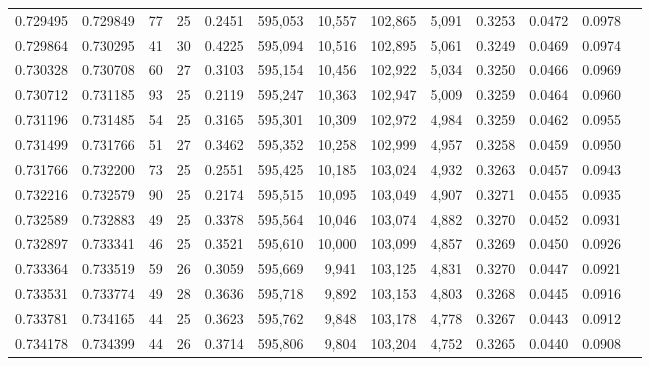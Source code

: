 \begin{tabular}{rrrrrrrrrrrrr}
0.729495 & 0.729849 &  77 &  25 &                                     0.2451 & 595,053 &  10,557 & 102,865 &   5,091 & 0.3253 & 0.0472 & 0.0978 \\
0.729864 & 0.730295 &  41 &  30 &                                     0.4225 & 595,094 &  10,516 & 102,895 &   5,061 & 0.3249 & 0.0469 & 0.0974 \\
0.730328 & 0.730708 &  60 &  27 &                                     0.3103 & 595,154 &  10,456 & 102,922 &   5,034 & 0.3250 & 0.0466 & 0.0969 \\
0.730712 & 0.731185 &  93 &  25 &                                     0.2119 & 595,247 &  10,363 & 102,947 &   5,009 & 0.3259 & 0.0464 & 0.0960 \\
0.731196 & 0.731485 &  54 &  25 &                                     0.3165 & 595,301 &  10,309 & 102,972 &   4,984 & 0.3259 & 0.0462 & 0.0955 \\
0.731499 & 0.731766 &  51 &  27 &                                     0.3462 & 595,352 &  10,258 & 102,999 &   4,957 & 0.3258 & 0.0459 & 0.0950 \\
0.731766 & 0.732200 &  73 &  25 &                                     0.2551 & 595,425 &  10,185 & 103,024 &   4,932 & 0.3263 & 0.0457 & 0.0943 \\
0.732216 & 0.732579 &  90 &  25 &                                     0.2174 & 595,515 &  10,095 & 103,049 &   4,907 & 0.3271 & 0.0455 & 0.0935 \\
0.732589 & 0.732883 &  49 &  25 &                                     0.3378 & 595,564 &  10,046 & 103,074 &   4,882 & 0.3270 & 0.0452 & 0.0931 \\
0.732897 & 0.733341 &  46 &  25 &                                     0.3521 & 595,610 &  10,000 & 103,099 &   4,857 & 0.3269 & 0.0450 & 0.0926 \\
0.733364 & 0.733519 &  59 &  26 &                                     0.3059 & 595,669 &   9,941 & 103,125 &   4,831 & 0.3270 & 0.0447 & 0.0921 \\
0.733531 & 0.733774 &  49 &  28 &                                     0.3636 & 595,718 &   9,892 & 103,153 &   4,803 & 0.3268 & 0.0445 & 0.0916 \\
0.733781 & 0.734165 &  44 &  25 &                                     0.3623 & 595,762 &   9,848 & 103,178 &   4,778 & 0.3267 & 0.0443 & 0.0912 \\
0.734178 & 0.734399 &  44 &  26 &                                     0.3714 & 595,806 &   9,804 & 103,204 &   4,752 & 0.3265 & 0.0440 & 0.0908 \\

\end{tabular}
